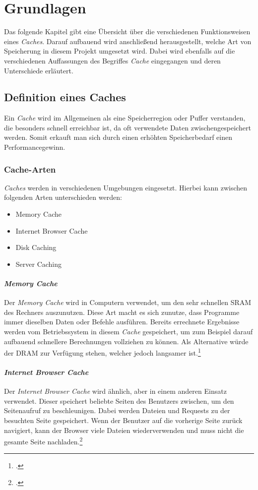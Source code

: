 \chapter{Grundlagen}
\label{cha:grundlagen}
Das folgende Kapitel gibt eine Übersicht über die verschiedenen Funktionsweisen eines \textit{Caches}. Darauf aufbauend wird anschließend herausgestellt, welche Art von Speicherung in diesem Projekt umgesetzt wird. Dabei wird ebenfalls auf die verschiedenen Auffassungen des Begriffes \textit{Cache} eingegangen und deren Unterschiede erläutert.
\section{Definition eines Caches}
\label{sec:cache-definition}
Ein \textit{Cache} wird im Allgemeinen als eine Speicherregion oder Puffer verstanden, die besonders schnell erreichbar ist, da oft verwendete Daten zwischengespeichert werden. Somit erkauft man sich durch einen erhöhten Speicherbedarf einen Performancegewinn.
\subsection{Cache-Arten}
\textit{Caches} werden in verschiedenen Umgebungen eingesetzt. Hierbei kann zwischen folgenden Arten unterschieden werden:
\begin{itemize}
\item Memory Cache
\item Internet Browser Cache
\item Disk Caching
\item Server Caching
\end{itemize}
\subsubsection*{\textit{Memory Cache}}
Der \textit{Memory Cache} wird in Computern verwendet, um den sehr schnellen \gls{SRAM} des Rechners auszunutzen. Diese Art macht es sich zunutze, dass Programme immer dieselben Daten oder Befehle ausführen. Bereits errechnete Ergebnisse werden vom Betriebssystem in diesem \textit{Cache} gespeichert, um zum Beispiel darauf aufbauend schnellere Berechnungen vollziehen zu können. Als Alternative würde der \gls{DRAM} zur Verfügung stehen, welcher jedoch langsamer ist.\footcite[Vgl.][S.48f.]{Cache-GummerSommer}
\subsubsection*{\textit{Internet Browser Cache}}
Der \textit{Internet Browser Cache} wird ähnlich, aber in einem anderen Einsatz verwendet. Dieser speichert beliebte Seiten des Benutzers zwischen, um den Seitenaufruf zu beschleunigen. Dabei werden Dateien und \glspl{Request} zu der besuchten Seite gespeichert. Wenn der Benutzer auf die vorherige Seite zurück navigiert, kann der \gls{Browser} viele Dateien wiederverwenden und muss nicht die gesamte Seite nachladen.\footcite{Cache-Techtarget}

